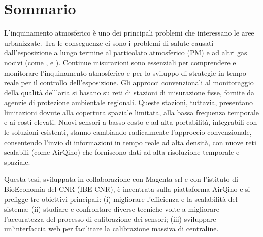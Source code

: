 \chapter{Sommario}\label{ch:sommario}

L'inquinamento atmosferico è uno dei principali problemi che interessano le aree urbanizzate. Tra le conseguenze ci sono i problemi di salute causati dall'esposizione a lungo termine al particolato atmosferico (PM) e ad altri gas nocivi (come ,  e ). Continue misurazioni sono essenziali per comprendere e monitorare l'inquinamento atmosferico e per lo sviluppo di strategie in tempo reale per il controllo dell'esposizione.
Gli approcci convenzionali al monitoraggio della qualità dell'aria si basano su reti di stazioni di misurazione fisse, fornite da agenzie di protezione ambientale regionali.
Queste stazioni, tuttavia, presentano limitazioni dovute alla copertura spaziale limitata, alla bassa frequenza temporale e ai costi elevati.
Nuovi sensori a basso costo e ad alta portabilità, integrabili con le soluzioni esistenti, stanno cambiando radicalmente l'approccio convenzionale, consentendo l'invio di informazioni in tempo reale ad alta densità, con nuove reti scalabili (come AirQino) che forniscono dati ad alta risoluzione temporale e spaziale.

Questa tesi, sviluppata in collaborazione con Magenta srl e con l'istituto di BioEconomia del CNR (IBE-CNR), è incentrata sulla piattaforma AirQino e si prefigge tre obiettivi principali: (i) migliorare l'efficienza e la scalabilità del sistema; (ii) studiare e confrontare diverse tecniche volte a migliorare l'accuratezza del processo di calibrazione dei sensori; (iii) sviluppare un'interfaccia web per facilitare la calibrazione massiva di centraline.
